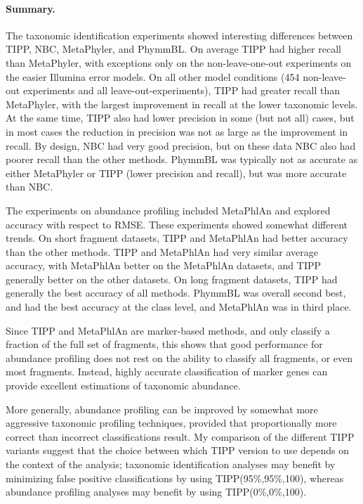 \paragraph{Summary.}
The taxonomic identification experiments showed 
interesting differences between TIPP, NBC, MetaPhyler, and PhymmBL.
On average TIPP had higher recall than MetaPhyler, 
with exceptions only on the non-leave-one-out 
experiments on the easier Illumina error models.  
On all other model conditions (454 non-leave-out experiments and all leave-out-experiments), TIPP had greater recall than MetaPhyler, with the largest improvement in recall at the lower taxonomic levels.  At the same time, TIPP also had lower precision in some (but not all) cases, but in most cases the reduction in precision was not as large as the improvement in recall. 
By design, 
NBC had very good precision, but
on these data
NBC also had
poorer recall  than the other methods.
PhymmBL was typically not as accurate as either MetaPhyler or 
TIPP (lower precision and recall), but was more accurate than NBC.

The experiments on abundance profiling
included MetaPhlAn and explored accuracy
with respect to RMSE. These experiments
showed somewhat different trends. 
On short fragment datasets,
TIPP and MetaPhlAn had better accuracy
than the other methods. TIPP and
MetaPhlAn
 had very similar
average accuracy, 
with
MetaPhlAn better on the MetaPhlAn datasets,
and TIPP generally better on the other datasets.
On long fragment datasets,
TIPP had generally
the best accuracy of all methods.
 PhymmBL was overall second best, and had the best
accuracy at the class level, 
and MetaPhlAn was in third place.

Since TIPP and MetaPhlAn are marker-based methods, and only
classify a fraction of the full set of fragments, this 
shows that good performance for abundance 
profiling does not rest on  the ability 
to classify all fragments, 
or even most fragments.
Instead, highly accurate classification of marker genes
can provide excellent estimations of taxonomic abundance.

More generally, 
abundance profiling can be improved by somewhat more
aggressive taxonomic profiling techniques, provided that
proportionally more correct than incorrect classifications result.
My comparison of the different TIPP variants suggest that the 
choice between which TIPP version to use depends on 
the context of the analysis; taxonomic identification analyses may benefit
by  minimizing false positive classifications by using TIPP(95\%,95\%,100), 
whereas abundance profiling analyses may 
benefit by using TIPP(0\%,0\%,100).  

